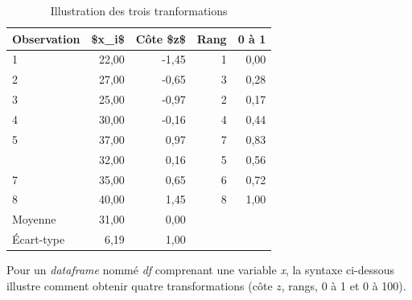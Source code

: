 \documentclass[
  11pt,
  french,
]{book}
\begin{document}
\begin{table}

\caption{\label{tab:AutresTransformation}Illustration des trois tranformations}
\centering
\fontsize{8}{10}\selectfont
\begin{tabular}[t]{lrrrr}
\toprule
Observation & \$x\_i\$ & Côte \$z\$ & Rang & 0 à 1\\
\midrule
1 & 22,00 & -1,45 & 1 & 0,00\\
2 & 27,00 & -0,65 & 3 & 0,28\\
3 & 25,00 & -0,97 & 2 & 0,17\\
4 & 30,00 & -0,16 & 4 & 0,44\\
5 & 37,00 & 0,97 & 7 & 0,83\\
\addlinespace
6 & 32,00 & 0,16 & 5 & 0,56\\
7 & 35,00 & 0,65 & 6 & 0,72\\
8 & 40,00 & 1,45 & 8 & 1,00\\
Moyenne & 31,00 & 0,00 &  & \\
Écart-type & 6,19 & 1,00 &  & \\
\bottomrule
\end{tabular}
\end{table}

Pour un \emph{dataframe} nommé \emph{df} comprenant une variable \emph{x}, la syntaxe ci-dessous illustre comment obtenir quatre transformations (côte \(z\), rangs, 0 à 1 et 0 à 100).
\end{document}
